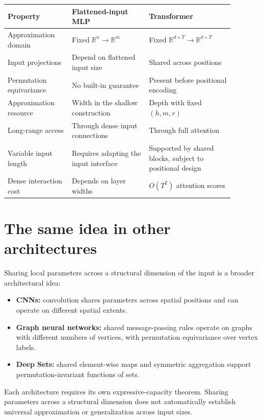 \documentclass[11pt]{article}
\begin{document}
\begin{center}
\small
\begin{tabular}{p{0.25\linewidth}p{0.30\linewidth}p{0.33\linewidth}}
\toprule
Property & Flattened-input MLP & Transformer \\
\midrule
Approximation domain & Fixed $\mathbb R^n\to\mathbb R^m$
  & Fixed $\mathbb R^{d\times T}\to\mathbb R^{d\times T}$ \\
Input projections & Depend on flattened input size
  & Shared across positions \\
Permutation equivariance & No built-in guarantee
  & Present before positional encoding \\
Approximation resource & Width in the shallow construction
  & Depth with fixed $(h,m,r)$ \\
Long-range access & Through dense input connections
  & Through full attention \\
Variable input length & Requires adapting the input interface
  & Supported by shared blocks, subject to positional design \\
Dense interaction cost & Depends on layer widths
  & $O(T^2)$ attention scores \\
\bottomrule
\end{tabular}
\end{center}

\section{The same idea in other architectures}

Sharing local parameters across a structural dimension of the input
is a broader architectural idea:

\begin{itemize}
\item \textbf{CNNs:} convolution shares parameters across spatial
positions and can operate on different spatial extents.
\item \textbf{Graph neural networks:} shared message-passing rules
operate on graphs with different numbers of vertices, with permutation
equivariance over vertex labels.
\item \textbf{Deep Sets:} shared element-wise maps and symmetric
aggregation support permutation-invariant functions of sets.
\end{itemize}

Each architecture requires its own expressive-capacity theorem.
Sharing parameters across a structural dimension does not automatically
establish universal approximation or generalization across input sizes.
\end{document}
